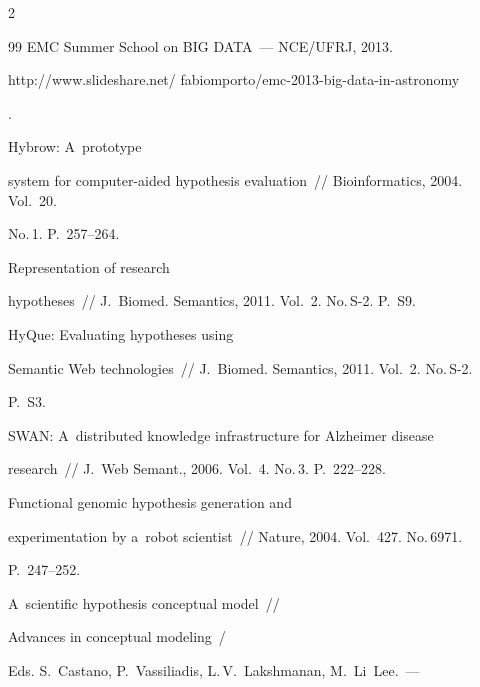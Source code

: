 \begin{multicols}{2}
{{\begin{thebibliography}{99}
EMC Summer School on BIG DATA~--- NCE/UFRJ, 2013.


{\sf


http://www.slideshare.net/ fabiomporto/emc-2013-big-data-in-astronomy}.




 Hybrow: A~prototype


system for computer-aided hypothesis evaluation~// Bioinformatics, 2004. Vol.~20.


No.\,1. P.~257--264.




 Representation of research


hypotheses~// J.~Biomed. Semantics, 2011. Vol.~2. No.\,S-2. P.~S9.




 HyQue: Evaluating hypotheses using


Semantic Web technologies~// J.~Biomed. Semantics, 2011. Vol.~2. No.\,S-2.


P.~S3.






SWAN: A~distributed knowledge infrastructure for Alzheimer disease


research~// J.~Web Semant., 2006. Vol.~4. No.\,3. P.~222--228.




 Functional genomic hypothesis generation and


experimentation by a~robot scientist~// Nature, 2004.  Vol.~427. No.\,6971.


P.~247--252.






A~scientific hypothesis conceptual model~//


{Advances in conceptual modeling}~/


Eds. S.~Castano, P.~Vassiliadis, L.\,V.~Lakshmanan, M.~Li~Lee.~---



\end{thebibliography}}}
\end{multicols}
